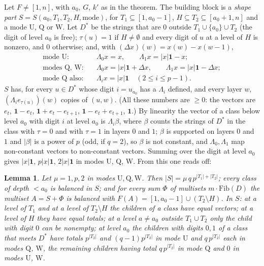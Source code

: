 \documentclass[11pt,a4paper]{amsart}
\newtheorem{lemma}[theorem]{Lemma}
\theoremstyle{definition}
\theoremstyle{remark}
\newcommand{\one}{\mathbf{1}}
\begin{document}
Let $F\ne[1,n]$, with $a_0$, $G$, $k'$ as in the theorem. The building block is a \emph{shape part}
$S=S(a_0,T_1,T_2,H,\text{mode})$, for $T_1\subseteq[1,a_0-1]$, $H\subseteq T_2\subseteq[a_0+1,n]$ and a mode
$\mathrm U$, $\mathrm Q$ or $\mathrm W$. Let $D^*$ be the strings that are $0$ outside
$T_1\cup\{a_0\}\cup T_2$ (the digit of level $a_0$ is free); $\tau(u)=1$ if $H\ne\emptyset$ and every digit
of $u$ at a level of $H$ is nonzero, and $0$ otherwise; and, with $(\Delta x)(w)=x(w)-x(w-1)$,
\begin{align*}
\text{mode U:}\quad&\Lambda_0x=x,\qquad \Lambda_1x=|x|\one-x;\\
\text{modes Q, W:}\quad&\Lambda_0x=|x|\one+\Delta x,\qquad\Lambda_1x=|x|\one-\Delta x;\\
\text{mode Q also:}\quad&\Lambda_ix=|x|\one\quad(2\le i\le p-1).
\end{align*}
$S$ has, for every $u\in D^*$ whose digit $i=u_{a_0}$ has a $\Lambda_i$ defined, and every layer $w$,
$(\Lambda_ie_{\tau(u)})(w)$ copies of $(u,w)$. (All these numbers are $\ge0$: the vectors are $e_t$,
$\one-e_t$, $\one+e_t-e_{t+1}$, $\one-e_t+e_{t+1}$, $\one$.) By linearity the vector of a class below
level $a_0$ with digit $i$ at level $a_0$ is $\Lambda_i\beta$, where $\beta$ counts the strings of $D^*$ in
the class with $\tau=0$ and with $\tau=1$ in layers $0$ and $1$; $\beta$ is supported on layers $0$ and $1$ and $|\beta|$ is a power of $p$ (odd, if $q=2$), so $\beta$ is
not constant, and $\Lambda_0,\Lambda_1$ map non-constant vectors to non-constant vectors. Summing over the
digit at level $a_0$ gives $|x|\one$, $p|x|\one$, $2|x|\one$ in modes U, Q, W. From this one reads off:

\begin{lemma}\label{lem:shape}
Let $\mu=1,p,2$ in modes $\mathrm U,\mathrm Q,\mathrm W$. Then $|S|=\mu\,q\,p^{|T_1|+|T_2|}$; every class of
depth $<a_0$ is balanced in $S$; and for every sum $\Phi$ of multisets $m\cdot\mathrm{Fib}(D)$ the multiset
$A=S+\Phi$ is balanced with $F(A)=[1,a_0-1]\cup(T_2\setminus H)$. In $S$: at a level of $T_1$ and at a level
of $T_2\setminus H$ the children of a class have equal vectors; at a level of $H$ they have equal totals;
at a level $a\ne a_0$ outside $T_1\cup T_2$ only the child with digit $0$ can be nonempty; at level $a_0$ the
children with digits $0,1$ of a class that meets $D^*$ have totals $p^{|T_2|}$ and $(q-1)p^{|T_2|}$ in mode
$\mathrm U$ and $q\,p^{|T_2|}$ each in modes $\mathrm Q$, $\mathrm W$, the remaining children having total
$q\,p^{|T_2|}$ in mode $\mathrm Q$ and $0$ in modes $\mathrm U$, $\mathrm W$.
\end{lemma}
\end{document}
